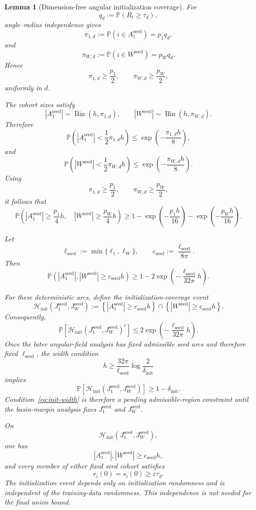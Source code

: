 \documentclass{article} %
\theoremstyle{plain}
\newtheorem{lemma}[theorem]{Lemma}
\theoremstyle{definition}
\theoremstyle{remark}
\begin{document}
\begin{lemma}[Dimension-free angular initialization coverage]
For
\[
q_d
:=
\mathbb P(R_i\ge\tau_d),
\]
angle--radius independence gives
\[
\pi_{1,d}
:=
\mathbb P(i\in A_1^{\mathrm{seed}})
=
p_1q_d,
\]
and
\[
\pi_{W,d}
:=
\mathbb P(i\in W^{\mathrm{seed}})
=
p_Wq_d.
\]
Hence
\[
\pi_{1,d}
\ge
\frac{p_1}{2},
\qquad
\pi_{W,d}
\ge
\frac{p_W}{2},
\]
uniformly in $d$.

The cohort sizes satisfy
\[
|A_1^{\mathrm{seed}}|
\sim
\operatorname{Bin}(h,\pi_{1,d}),
\qquad
|W^{\mathrm{seed}}|
\sim
\operatorname{Bin}(h,\pi_{W,d}).
\]
Therefore
\[
\boxed{
\mathbb P
\left(
|A_1^{\mathrm{seed}}|
<
\frac12\pi_{1,d}h
\right)
\le
\exp\left(-\frac{\pi_{1,d}h}{8}\right),
}
\]
and
\[
\boxed{
\mathbb P
\left(
|W^{\mathrm{seed}}|
<
\frac12\pi_{W,d}h
\right)
\le
\exp\left(-\frac{\pi_{W,d}h}{8}\right).
}
\]
Using
\[
\pi_{1,d}\ge\frac{p_1}{2},
\qquad
\pi_{W,d}\ge\frac{p_W}{2},
\]
it follows that
\[
\boxed{
\mathbb P
\left(
|A_1^{\mathrm{seed}}|
\ge
\frac{p_1}{4}h,
\quad
|W^{\mathrm{seed}}|
\ge
\frac{p_W}{4}h
\right)
\ge
1
-
\exp\left(-\frac{p_1h}{16}\right)
-
\exp\left(-\frac{p_Wh}{16}\right).
}
\]

Let
\[
\ell_{\mathrm{seed}}
:=
\min\{\ell_1,\ell_W\},
\qquad
c_{\mathrm{seed}}
:=
\frac{\ell_{\mathrm{seed}}}{8\pi}.
\]
Then
\[
\boxed{
\mathbb P
\left(
|A_1^{\mathrm{seed}}|,
|W^{\mathrm{seed}}|
\ge
c_{\mathrm{seed}}h
\right)
\ge
1
-
2\exp
\left(
-\frac{\ell_{\mathrm{seed}}}{32\pi}h
\right).
}
\]

For these deterministic arcs, define the initialization-coverage event
\[
\boxed{
\mathcal H_{\mathrm{init}}
\left(
J_1^{\mathrm{seed}},
J_W^{\mathrm{seed}}
\right)
:=
\left\{
|A_1^{\mathrm{seed}}|
\ge
c_{\mathrm{seed}}h
\right\}
\cap
\left\{
|W^{\mathrm{seed}}|
\ge
c_{\mathrm{seed}}h
\right\}.
}
\]
Consequently,
\[
\boxed{
\mathbb P
\left[
\mathcal H_{\mathrm{init}}
\left(
J_1^{\mathrm{seed}},
J_W^{\mathrm{seed}}
\right)^c
\right]
\le
2\exp
\left(
-\frac{\ell_{\mathrm{seed}}}{32\pi}h
\right).
}
\]
Once the later angular-field analysis has fixed admissible seed arcs and
therefore fixed $\ell_{\mathrm{seed}}$, the width condition
\begin{equation}
\boxed{
h
\ge
\frac{32\pi}{\ell_{\mathrm{seed}}}
\log
\frac{2}{\delta_{\mathrm{init}}}
}
\label{eq:init-width}
\end{equation}
implies
\[
\boxed{
\mathbb P
\left[
\mathcal H_{\mathrm{init}}
\left(
J_1^{\mathrm{seed}},
J_W^{\mathrm{seed}}
\right)
\right]
\ge
1-\delta_{\mathrm{init}}.
}
\]
Condition~\eqref{eq:init-width} is therefore a pending admissible-region
constraint until the basin-margin analysis fixes $J_1^{\mathrm{seed}}$ and
$J_W^{\mathrm{seed}}$.

On
\[
\mathcal H_{\mathrm{init}}
\left(
J_1^{\mathrm{seed}},
J_W^{\mathrm{seed}}
\right),
\]
one has
\[
|A_1^{\mathrm{seed}}|,
|W^{\mathrm{seed}}|
\ge
c_{\mathrm{seed}}h,
\]
and every member of either fixed seed cohort satisfies
\[
\boxed{
r_i(0)
=
s_i(0)
\ge
\varepsilon\tau_d.
}
\]
The initialization event depends only on initialization randomness and is
independent of the training-data randomness. This independence is not needed
for the final union bound.
\end{lemma}
\end{document}
